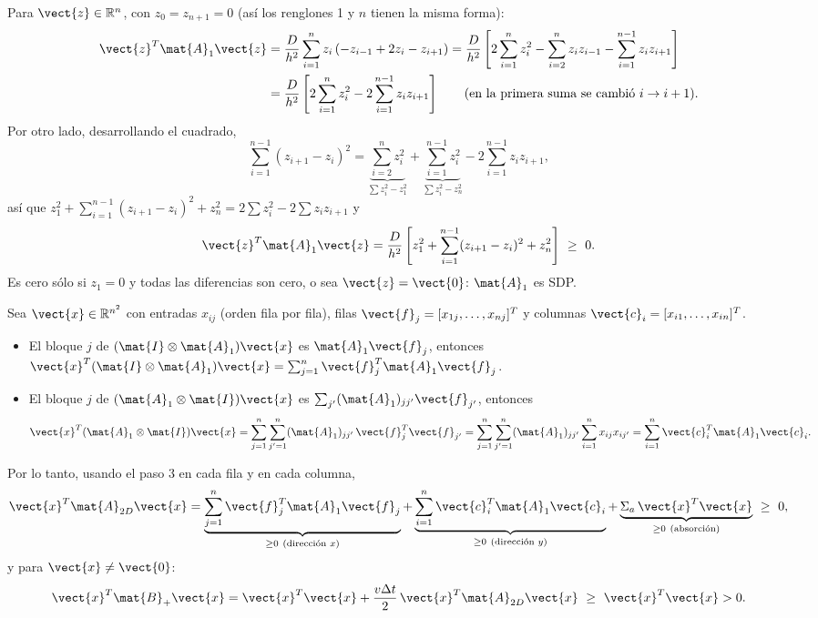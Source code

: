 Para $\vect{z}\in\mathbb{R}^n$, con $z_0 = z_{n+1} = 0$ (así los renglones 1 y $n$ tienen la misma forma):
\begin{align*}
  \vect{z}^T\mat{A}_1\vect{z}
  &= \frac{D}{h^2}\sum_{i=1}^{n} z_i\,(-z_{i-1} + 2z_i - z_{i+1})
   = \frac{D}{h^2}\left[2\sum_{i=1}^{n} z_i^2 - \sum_{i=2}^{n} z_i z_{i-1} - \sum_{i=1}^{n-1} z_i z_{i+1}\right]\\
  &= \frac{D}{h^2}\left[2\sum_{i=1}^{n} z_i^2 - 2\sum_{i=1}^{n-1} z_i z_{i+1}\right]
  \qquad (\text{en la primera suma se cambió } i\to i+1).
\end{align*}
Por otro lado, desarrollando el cuadrado,
\[
  \sum_{i=1}^{n-1}(z_{i+1} - z_i)^2
  = \underbrace{\sum_{i=2}^{n} z_i^2}_{\sum z_i^2 - z_1^2} + \underbrace{\sum_{i=1}^{n-1} z_i^2}_{\sum z_i^2 - z_n^2}
    - 2\sum_{i=1}^{n-1} z_i z_{i+1},
\]
así que $z_1^2 + \sum_{i=1}^{n-1}(z_{i+1} - z_i)^2 + z_n^2 = 2\sum z_i^2 - 2\sum z_iz_{i+1}$ y
\[
  \vect{z}^T\mat{A}_1\vect{z} = \frac{D}{h^2}\left[z_1^2 + \sum_{i=1}^{n-1}(z_{i+1} - z_i)^2 + z_n^2\right] \ \ge\ 0 .
\]
Es cero sólo si $z_1 = 0$ y todas las diferencias son cero, o sea $\vect{z} = \vect{0}$: $\mat{A}_1$ es SDP.

Sea $\vect{x}\in\mathbb{R}^{n^2}$ con entradas $x_{ij}$ (orden fila por fila), filas
$\vect{f}_j = [x_{1j}, \dots, x_{nj}]^T$ y columnas $\vect{c}_i = [x_{i1}, \dots, x_{in}]^T$.
\begin{itemize}
  \item El bloque $j$ de $(\mat{I}\otimes\mat{A}_1)\vect{x}$ es $\mat{A}_1\vect{f}_j$, entonces
        $\vect{x}^T(\mat{I}\otimes\mat{A}_1)\vect{x} = \sum_{j=1}^{n}\vect{f}_j^T\mat{A}_1\vect{f}_j$.
  \item El bloque $j$ de $(\mat{A}_1\otimes\mat{I})\vect{x}$ es $\sum_{j'}(\mat{A}_1)_{jj'}\vect{f}_{j'}$, entonces
        \[
          \vect{x}^T(\mat{A}_1\otimes\mat{I})\vect{x}
          = \sum_{j=1}^{n}\sum_{j'=1}^{n}(\mat{A}_1)_{jj'}\,\vect{f}_j^T\vect{f}_{j'}
          = \sum_{j=1}^{n}\sum_{j'=1}^{n}(\mat{A}_1)_{jj'}\sum_{i=1}^{n}x_{ij}x_{ij'}
          = \sum_{i=1}^{n}\vect{c}_i^T\mat{A}_1\vect{c}_i .
        \]
\end{itemize}
Por lo tanto, usando el paso 3 en cada fila y en cada columna,
\[
  \vect{x}^T\mat{A}_{2D}\vect{x}
  = \underbrace{\sum_{j=1}^{n}\vect{f}_j^T\mat{A}_1\vect{f}_j}_{\ge0\ (\text{dirección } x)}
  + \underbrace{\sum_{i=1}^{n}\vect{c}_i^T\mat{A}_1\vect{c}_i}_{\ge0\ (\text{dirección } y)}
  + \underbrace{\Sigma_a\,\vect{x}^T\vect{x}}_{\ge0\ (\text{absorción})} \ \ge\ 0,
\]
y para $\vect{x}\neq\vect{0}$:
\[
  \vect{x}^T\mat{B}_{+}\vect{x} = \vect{x}^T\vect{x} + \frac{v\Delta t}{2}\,\vect{x}^T\mat{A}_{2D}\vect{x}
  \ \ge\ \vect{x}^T\vect{x} > 0 .
\]

